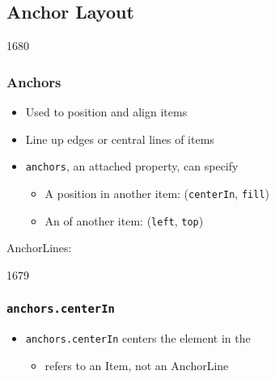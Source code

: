 %
%
%
%

\subsection{Anchor Layout}


\begin{slide}{1680}
\frametitle{Anchors}

\begin{itemize}
\item Used to position and align items
\item Line up edges or central lines of items
\item \texttt{anchors}, an attached property, can specify
\begin{itemize}
\item A position in another item: (\texttt{centerIn}, \texttt{fill})
\item An  of another item: (\texttt{left}, \texttt{top})
\end{itemize}
\end{itemize}
\begin{flushright}
AnchorLines: \hspace{1in} \\
\end{flushright}
\end{slide}


\begin{slide}{1679}
\frametitle{\texttt{anchors.centerIn}}


\begin{itemize}
\item \texttt{anchors.centerIn} centers the 
element in the 
  \begin{itemize}
  \item refers to an Item, not an AnchorLine
  \end{itemize}
\end{itemize}                              
\end{slide}

